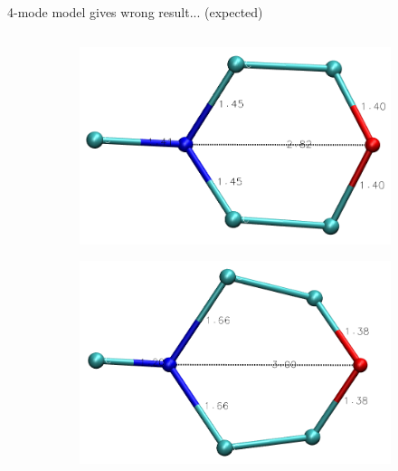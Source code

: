 \documentclass{beamer}
\begin{document}
\begin{frame}{4-mode model gives wrong result... (expected)}
\begin{columns}
\begin{column}{0.5\textwidth}
	\vspace{-5mm}
\begin{figure}
	\centering
	\begin{subfigure}[b]{0.4\textwidth}
		\centering
		\includegraphics[width=\textwidth]{argmin_traj_50000_vstrongmodes_frame0.png}
	\end{subfigure}
	\begin{subfigure}[b]{0.4\textwidth}
		\centering
		\includegraphics[width=\textwidth]{argmin_traj_50000_vstrongmodes_frame36.png}
	\end{subfigure}
\end{figure}
\begin{figure}
	\centering

\end{figure}
\end{column}
\end{columns}
\end{frame}
\end{document}
